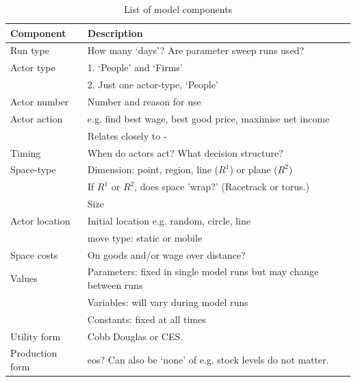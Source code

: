 \renewcommand{\arraystretch}{1.2}
\begin{table}[!hbt]
\begin{center}

\begin{tabular}{|l|l|}
\hline 
\textbf{Component} & \textbf{Description}\\
\hline
Run type & How many `days'? Are parameter sweep runs used?\\
\hline
Actor type & 1. `People' and `Firms'\\
& 2. Just one actor-type, `People'\\
\hline
Actor number & Number and reason for use\\
\hline
Actor action & e.g. find best wage, best good price, maximise net income\\
& Relates closely to -\\
\hline
Timing &
When do actors act? What decision structure?\\
\hline
Space-type &
Dimension: point, region, line ($R^1$) or plane ($R^2$)\\
& If $R^1$ or $R^2$, does space 'wrap?' (Racetrack or torus.)\\
& Size\\
\hline
Actor location & Initial location e.g. random, circle, line\\
&move type: static or mobile\\
\hline
Space costs & On goods and/or wage over distance?\\
\hline
Values & Parameters: fixed in single model runs but may change between runs\\
& Variables: will vary during model runs\\
& Constants: fixed at all times\\
\hline
Utility form & Cobb Douglas or CES.\\
\hline
Production form & \gls{eos}? Can also be `none' of e.g. stock levels do not matter.\\
\hline


\end{tabular}

\caption{List of model components \label{tab:components}}
\end{center}
\end{table}